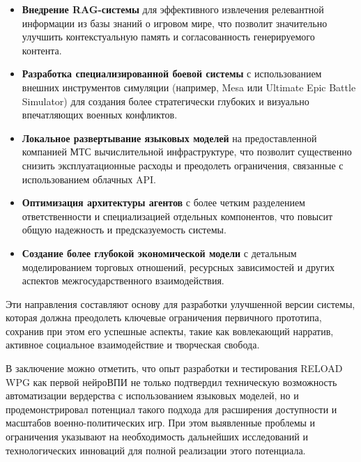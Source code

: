 \begin{itemize}
    \item \textbf{Внедрение RAG-системы} для эффективного извлечения релевантной информации из базы знаний о игровом мире, что позволит значительно улучшить контекстуальную память и согласованность генерируемого контента.

    \item \textbf{Разработка специализированной боевой системы} с использованием внешних инструментов симуляции (например, Mesa или Ultimate Epic Battle Simulator) для создания более стратегически глубоких и визуально впечатляющих военных конфликтов.

    \item \textbf{Локальное развертывание языковых моделей} на предоставленной компанией МТС вычислительной инфраструктуре, что позволит существенно снизить эксплуатационные расходы и преодолеть ограничения, связанные с использованием облачных API.

    \item \textbf{Оптимизация архитектуры агентов} с более четким разделением ответственности и специализацией отдельных компонентов, что повысит общую надежность и предсказуемость системы.

    \item \textbf{Создание более глубокой экономической модели} с детальным моделированием торговых отношений, ресурсных зависимостей и других аспектов межгосударственного взаимодействия.
\end{itemize}

Эти направления составляют основу для разработки улучшенной версии системы, которая должна преодолеть ключевые ограничения первичного прототипа, сохранив при этом его успешные аспекты, такие как вовлекающий нарратив, активное социальное взаимодействие и творческая свобода.

В заключение можно отметить, что опыт разработки и тестирования RELOAD WPG как первой нейроВПИ не только подтвердил техническую возможность автоматизации вердерства с использованием языковых моделей, но и продемонстрировал потенциал такого подхода для расширения доступности и масштабов военно-политических игр. При этом выявленные проблемы и ограничения указывают на необходимость дальнейших исследований и технологических инноваций для полной реализации этого потенциала.